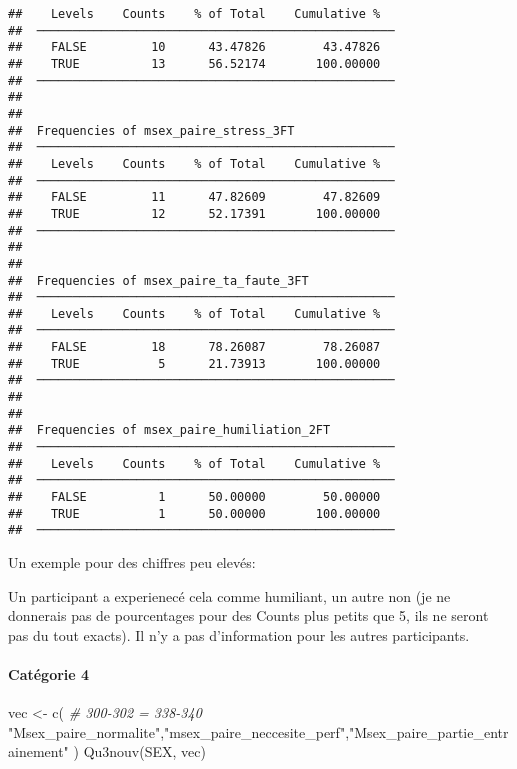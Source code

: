 \documentclass[
]{article}
\newenvironment{Shaded}{\begin{snugshade}}{\end{snugshade}}
\newcommand{\CommentTok}[1]{\textcolor[rgb]{0.56,0.35,0.01}{\textit{#1}}}
\newcommand{\FunctionTok}[1]{\textcolor[rgb]{0.00,0.00,0.00}{#1}}
\newcommand{\NormalTok}[1]{#1}
\newcommand{\OtherTok}[1]{\textcolor[rgb]{0.56,0.35,0.01}{#1}}
\newcommand{\StringTok}[1]{\textcolor[rgb]{0.31,0.60,0.02}{#1}}
\begin{document}
\begin{verbatim}
##    Levels    Counts    % of Total    Cumulative %   
##  ────────────────────────────────────────────────── 
##    FALSE         10      43.47826        43.47826   
##    TRUE          13      56.52174       100.00000   
##  ────────────────────────────────────────────────── 
## 
## 
##  Frequencies of msex_paire_stress_3FT               
##  ────────────────────────────────────────────────── 
##    Levels    Counts    % of Total    Cumulative %   
##  ────────────────────────────────────────────────── 
##    FALSE         11      47.82609        47.82609   
##    TRUE          12      52.17391       100.00000   
##  ────────────────────────────────────────────────── 
## 
## 
##  Frequencies of msex_paire_ta_faute_3FT             
##  ────────────────────────────────────────────────── 
##    Levels    Counts    % of Total    Cumulative %   
##  ────────────────────────────────────────────────── 
##    FALSE         18      78.26087        78.26087   
##    TRUE           5      21.73913       100.00000   
##  ────────────────────────────────────────────────── 
## 
## 
##  Frequencies of msex_paire_humiliation_2FT          
##  ────────────────────────────────────────────────── 
##    Levels    Counts    % of Total    Cumulative %   
##  ────────────────────────────────────────────────── 
##    FALSE          1      50.00000        50.00000   
##    TRUE           1      50.00000       100.00000   
##  ──────────────────────────────────────────────────
\end{verbatim}

Un exemple pour des chiffres peu elevés:

Un participant a experienecé cela comme humiliant, un autre non (je ne
donnerais pas de pourcentages pour des Counts plus petits que 5, ils ne
seront pas du tout exacts). Il n'y a pas d'information pour les autres
participants.

\hypertarget{catuxe9gorie-4-3}{%
\paragraph{Catégorie 4}\label{catuxe9gorie-4-3}}

\begin{Shaded}
\begin{Highlighting}[]
\NormalTok{vec }\OtherTok{\textless{}{-}} \FunctionTok{c}\NormalTok{(  }\CommentTok{\# 300{-}302 = 338{-}340}
  \StringTok{"Msex\_paire\_normalite"}\NormalTok{,}\StringTok{"msex\_paire\_neccesite\_perf"}\NormalTok{,}\StringTok{"Msex\_paire\_partie\_entrainement"}
\NormalTok{)}
\FunctionTok{Qu3nouv}\NormalTok{(SEX, vec)}
\end{Highlighting}
\end{Shaded}
\end{document}
